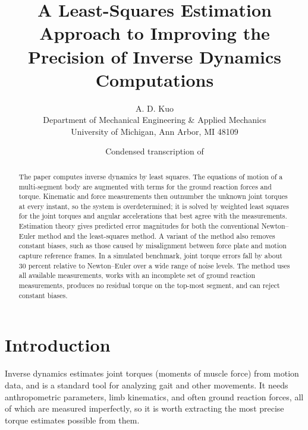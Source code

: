 \documentclass[11pt]{article}
\title{A Least-Squares Estimation Approach to Improving the Precision of
Inverse Dynamics Computations}
\author{A. D. Kuo\\[2pt]
\small Department of Mechanical Engineering \& Applied Mechanics\\
\small University of Michigan, Ann Arbor, MI 48109}
\date{\small Condensed transcription of \cite{Kuo1998}}
\begin{document}
\maketitle

\noindent{}

\begin{abstract}
The paper computes inverse dynamics by least squares. The equations of motion
of a multi-segment body are augmented with terms for the ground reaction
forces and torque. Kinematic and force measurements then outnumber the
unknown joint torques at every instant, so the system is overdetermined; it is
solved by weighted least squares for the joint torques and angular
accelerations that best agree with the measurements. Estimation theory gives
predicted error magnitudes for both the conventional Newton--Euler method and
the least-squares method. A variant of the method also removes constant
biases, such as those caused by misalignment between force plate and motion
capture reference frames. In a simulated benchmark, joint torque errors fall
by about 30 percent relative to Newton--Euler over a wide range of noise
levels. The method uses all available measurements, works with an incomplete
set of ground reaction measurements, produces no residual torque on the
top-most segment, and can reject constant biases.
\end{abstract}

\section*{Introduction}

Inverse dynamics estimates joint torques (moments of muscle force) from
motion data, and is a standard tool for analyzing gait and other movements. It
needs anthropometric parameters, limb kinematics, and often ground reaction
forces, all of which are measured imperfectly, so it is worth extracting the
most precise torque estimates possible from them.
\end{document}
